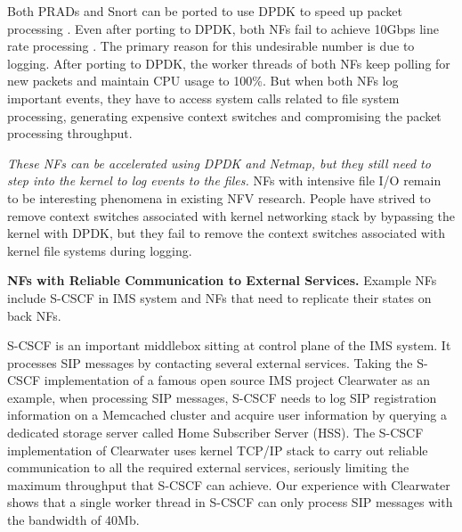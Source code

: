 Both PRADs and Snort can be ported to use DPDK to speed up packet processing
\cite{201546}. Even after porting to DPDK, both NFs fail to achieve 10Gbps line
rate processing \cite{201546}. The primary reason for this undesirable number is
due to logging. After porting to DPDK, the worker threads of both NFs keep
polling for new packets and maintain CPU usage to 100\%. But when both NFs log
important events, they have to access system calls related to file system
processing, generating expensive context switches and compromising the packet
processing throughput.

\textit{These NFs can be accelerated using DPDK and Netmap, but they still need
  to step into the kernel to log events to the files.} NFs with intensive file
I/O remain to be interesting phenomena in existing NFV research. People have
strived to remove context switches associated with kernel networking stack by
bypassing the kernel with DPDK, but they fail to remove the context switches
associated with kernel file systems during logging.

\noindent \textbf{NFs with Reliable Communication to External Services.}
Example NFs include S-CSCF in IMS system \cite{3gpp-ims} and NFs that need to
replicate their states on back NFs.

S-CSCF is an important middlebox sitting at control plane of the IMS system. It
processes SIP \cite{sip} messages by contacting several external
services. Taking the S-CSCF implementation of a famous open source IMS project
Clearwater \cite{project-clearwater} as an example, when processing SIP messages,
S-CSCF needs to log SIP registration information on a Memcached \cite{memcached}
cluster and acquire user information by querying a dedicated storage server
called Home Subscriber Server (HSS). The S-CSCF implementation of Clearwater
uses kernel TCP/IP stack to carry out reliable communication to all the required
external services, seriously limiting the maximum throughput that S-CSCF can
achieve. Our experience with Clearwater shows that a single worker thread in
S-CSCF can only process SIP messages with the bandwidth of 40Mb.

